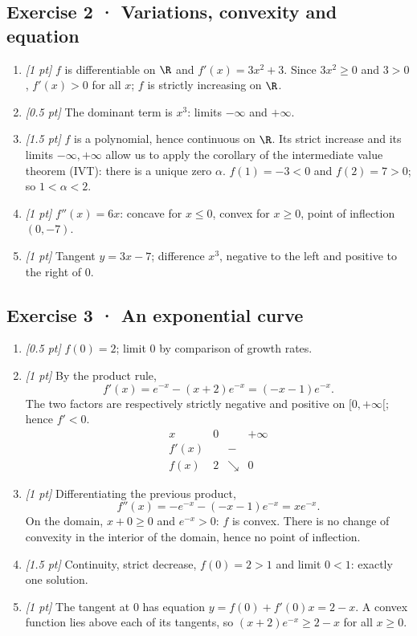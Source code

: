 \subsection*{Exercise 2 · Variations, convexity and equation}\begin{enumerate}

\item \textit{[1 pt]} $f$ is differentiable on $\R$ and $f'(x)=3x^2+3$. Since $3x^2\ge0$ and $3>0$, $f'(x)>0$ for all $x$; $f$ is strictly increasing on $\R$.

\item \textit{[0.5 pt]} The dominant term is $x^3$: limits $-\infty$ and $+\infty$.

\item \textit{[1.5 pt]} $f$ is a polynomial, hence continuous on $\R$. Its strict increase and its limits $-\infty,+\infty$ allow us to apply the corollary of the intermediate value theorem (IVT): there is a unique zero $\alpha$. $f(1)=-3<0$ and $f(2)=7>0$; so $1<\alpha<2$.

\item \textit{[1 pt]} $f''(x)=6x$: concave for $x\le0$, convex for $x\ge0$, point of inflection $(0,-7)$.

\item \textit{[1 pt]} Tangent $y=3x-7$; difference $x^3$, negative to the left and positive to the right of $0$.

\end{enumerate}

\subsection*{Exercise 3 · An exponential curve}\begin{enumerate}

\item \textit{[0.5 pt]} $f(0)=2$; limit $0$ by comparison of growth rates.

\item \textit{[1 pt]} By the product rule,
\[f'(x)=e^{-x}-(x+2)e^{-x}=(-x-1)e^{-x}.\]
The two factors are respectively strictly negative and positive on $[0,+\infty[$; hence $f'<0$.
\[\begin{array}{c|ccc}x&0&&+\infty\\\hline f'(x)&&-&\\\hline f(x)&2&\searrow&0\end{array}\]

\item \textit{[1 pt]} Differentiating the previous product,
\[f''(x)=-e^{-x}-(-x-1)e^{-x}=xe^{-x}.\]
On the domain, $x+0\ge0$ and $e^{-x}>0$: $f$ is convex. There is no change of convexity in the interior of the domain, hence no point of inflection.

\item \textit{[1.5 pt]} Continuity, strict decrease, $f(0)=2>1$ and limit $0<1$: exactly one solution.

\item \textit{[1 pt]} The tangent at $0$ has equation $y=f(0)+f'(0)x=2-x$. A convex function lies above each of its tangents, so $(x+2)e^{-x}\ge 2-x$ for all $x\ge0$.

\end{enumerate}

